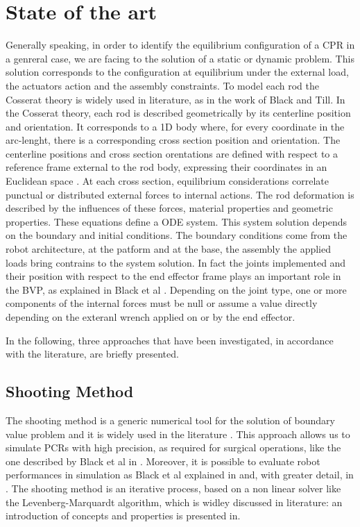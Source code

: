 \documentclass{thesisreport}
\begin{document}
 \chapter{State of the art}
 Generally speaking, in order to identify the equilibrium configuration of a CPR in a genreral case, we are facing to the solution of a static or dynamic problem. This solution corresponds to the configuration at equilibrium under the external load, the actuators action and the assembly constraints. To model each rod the Cosserat theory is widely used in literature, as in the work of Black\cite{black_parallel_2018}\cite{black_modeling_2017} and Till\cite{till_efficient_2015}\cite{till_real-time_2019}. In the Cosserat theory, each rod is described geometrically by its centerline position and orientation. It corresponds to a 1D body where, for every coordinate in the arc-lenght, there is a corresponding cross section position and orientation. The centerline positions and cross section orentations are defined with respect to a reference frame external to the rod body, expressing their coordinates in an Euclidean space \cite{selig_geometric_2005}. 
 At each cross section, equilibrium considerations correlate punctual or distributed external forces to internal actions. The rod deformation is described by the influences of these forces, material properties and geometric properties. These equations define a ODE system. This system solution depends on the boundary and initial conditions. The boundary conditions come from the robot architecture, at the patform and at the base, the assembly the applied loads bring contrains to the system solution. In fact the joints implemented and their position with respect to the end effector frame plays an important role in the BVP, as explained in Black et al \cite{black_parallel_2018}. Depending on the joint type, one or more components of the internal forces must be null or assume a value directly depending on the exteranl wrench applied on or by the end effector.  
 
 In the following, three approaches that have been investigated, in accordance with the literature, are briefly presented.
 
 \section{Shooting Method}
 The shooting method is a generic numerical tool for the solution of boundary value problem and it is widely used in the literature \cite{black_parallel_2018}\cite{black_modeling_2017}\cite{florian_geometrically_2020}. This approach allows us to simulate PCRs with high precision, as required for surgical operations, like the one described by Black et al in \cite{black_modeling_2017}. Moreover, it is possible to evaluate robot performances in simulation as Black et al explained in \cite{black_parallel_2018} and, with greater detail, in \cite{black_modeling_2017}. The shooting method is an iterative process, based on a non linear solver like the Levenberg-Marquardt algorithm, which is widley discussed in literature: an introduction of concepts and properties is presented in\cite{lourakis_brief_nodate}.
  
\end{document}
